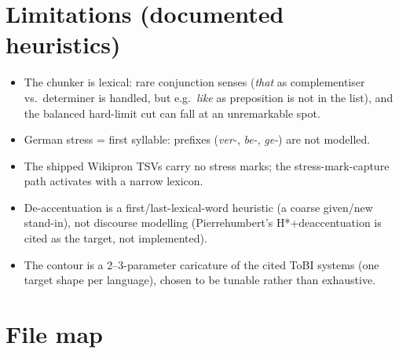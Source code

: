 \documentclass[11pt,a4paper]{article}
\begin{document}
\section{Limitations (documented heuristics)}\label{sec:limits}

\begin{itemize}[itemsep=2pt]
\item The chunker is lexical: rare conjunction senses
  (\emph{that} as complementiser vs.\ determiner is handled, but
  e.g.\ \emph{like} as preposition is not in the list), and the
  balanced hard-limit cut can fall at an unremarkable spot.
\item German stress = first syllable: prefixes
  (\emph{ver-}, \emph{be-}, \emph{ge-}) are not modelled.
\item The shipped Wikipron TSVs carry no stress marks; the
  stress-mark-capture path activates with a narrow
  lexicon.
\item De-accentuation is a first/last-lexical-word heuristic
  (a coarse given/new stand-in), not discourse modelling
  (Pierrehumbert's H*+deaccentuation is cited as the target, not
  implemented).
\item The contour is a 2--3-parameter caricature of the cited
  ToBI systems (one target shape per language), chosen to be
  tunable rather than exhaustive.
\end{itemize}

\section{File map}\label{sec:files}
\end{document}

